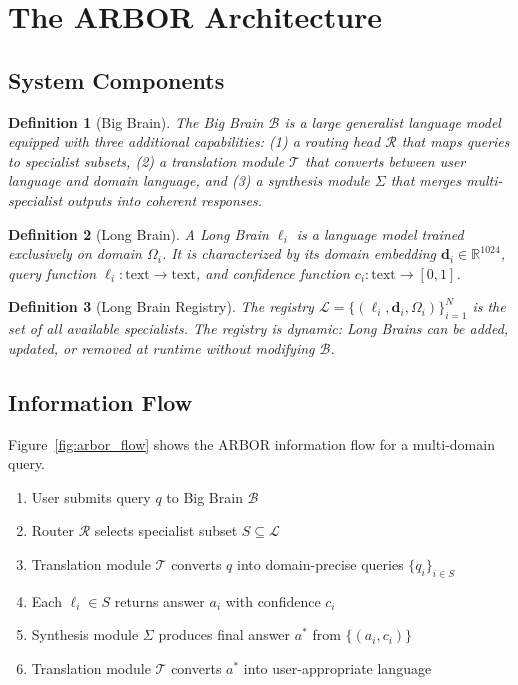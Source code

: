 \documentclass[12pt]{article}
\newtheorem{definition}{Definition}
\begin{document}
\section{The ARBOR Architecture}
\label{sec:arch}

\subsection{System Components}

\begin{definition}[Big Brain]
The Big Brain $\mathcal{B}$ is a large generalist language model equipped with three additional capabilities: (1) a routing head $\mathcal{R}$ that maps queries to specialist subsets, (2) a translation module $\mathcal{T}$ that converts between user language and domain language, and (3) a synthesis module $\Sigma$ that merges multi-specialist outputs into coherent responses.
\end{definition}

\begin{definition}[Long Brain]
A Long Brain $\ell_i$ is a language model trained exclusively on domain $\Omega_i$. It is characterized by its domain embedding $\mathbf{d}_i \in \mathbb{R}^{1024}$, query function $\ell_i: \text{text} \rightarrow \text{text}$, and confidence function $c_i: \text{text} \rightarrow [0,1]$.
\end{definition}

\begin{definition}[Long Brain Registry]
The registry $\mathcal{L} = \{(\ell_i, \mathbf{d}_i, \Omega_i)\}_{i=1}^{N}$ is the set of all available specialists. The registry is dynamic: Long Brains can be added, updated, or removed at runtime without modifying $\mathcal{B}$.
\end{definition}

\subsection{Information Flow}

Figure~\ref{fig:arbor_flow} shows the ARBOR information flow for a multi-domain query.

\begin{enumerate}
    \item User submits query $q$ to Big Brain $\mathcal{B}$
    \item Router $\mathcal{R}$ selects specialist subset $S \subseteq \mathcal{L}$
    \item Translation module $\mathcal{T}$ converts $q$ into domain-precise queries $\{q_i\}_{i \in S}$
    \item Each $\ell_i \in S$ returns answer $a_i$ with confidence $c_i$
    \item Synthesis module $\Sigma$ produces final answer $a^*$ from $\{(a_i, c_i)\}$
    \item Translation module $\mathcal{T}$ converts $a^*$ into user-appropriate language
\end{enumerate}
\end{document}

